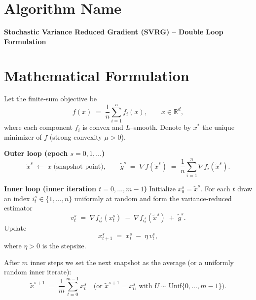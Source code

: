 \documentclass{article}
\newcommand{\R}{\mathbb{R}}
\newcommand{\grad}{\nabla}
\begin{document}
\section*{Algorithm Name}
\textbf{Stochastic Variance Reduced Gradient (SVRG) – Double Loop Formulation}

\section*{Mathematical Formulation}
Let the finite‑sum objective be 
\[
f(x)\;=\;\frac{1}{n}\sum_{i=1}^{n} f_i(x),\qquad x\in\R^{d},
\]
where each component $f_i$ is convex and $L$–smooth.  
Denote by $x^{*}$ the unique minimizer of $f$ (strong convexity $\mu>0$).

\medskip
\noindent\textbf{Outer loop (epoch $s=0,1,\dots$)}  
\[
\tilde{x}^{s}\;\leftarrow\;x\; \text{(snapshot point)} ,
\qquad 
\tilde{g}^{s}\;=\;\grad f(\tilde{x}^{s})\;=\;\frac1n\sum_{i=1}^{n}\grad f_i(\tilde{x}^{s}).
\]

\medskip
\noindent\textbf{Inner loop (inner iteration $t=0,\dots,m-1$)}  
Initialize $x_{0}^{s}=\tilde{x}^{s}$.  
For each $t$ draw an index $i_{t}^{s}\!\in\!\{1,\dots,n\}$ uniformly at random and form the
variance‑reduced estimator
\[
v_{t}^{s}\;=\;\grad f_{i_{t}^{s}}(x_{t}^{s})\;-\;\grad f_{i_{t}^{s}}(\tilde{x}^{s})\;+\;\tilde{g}^{s}.
\tag{1}
\]
Update
\[
x_{t+1}^{s}\;=\;x_{t}^{s}\;-\;\eta\,v_{t}^{s},
\tag{2}
\]
where $\eta>0$ is the stepsize.

After $m$ inner steps we set the next snapshot as the average (or a uniformly
random inner iterate):
\[
\tilde{x}^{s+1}\;=\;\frac{1}{m}\sum_{t=0}^{m-1}x_{t}^{s}
\quad\text{(or } \tilde{x}^{s+1}=x_{U}^{s}\text{ with }U\sim\text{Unif}\{0,\dots,m-1\}\text{)}.
\]
\end{document}
